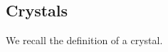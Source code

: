 \documentclass[11pt,reqno]{amsart}
\numberwithin{equation}{section}
\theoremstyle{definition}
\theoremstyle{named}
\newcommand{\cC}{\mathcal{C}}
\newcommand{\cU}{\mathcal{U}}
\newcommand{\fg}{\mathfrak{g}}
\newcommand{\eps}{\varepsilon}
\newcommand{\Hom}{\operatorname{Hom}}
\begin{document}
%
%


\subsection{Crystals}

We recall the definition of a crystal. 
\end{document}
